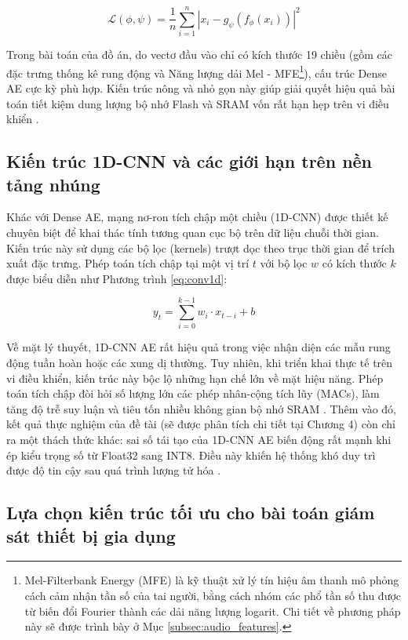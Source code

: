 \begin{equation}\label{eq:mse_loss}\mathcal{L}(\phi, \psi) = \frac{1}{n} \sum_{i=1}^{n} |x_i - g_{\psi}(f_{\phi}(x_i))|^2\end{equation}

Trong bài toán của đồ án, do vectơ đầu vào chỉ có kích thước 19 chiều (gồm các đặc trưng thống kê rung động và Năng lượng dải Mel - MFE\footnote{Mel-Filterbank Energy (MFE) là kỹ thuật xử lý tín hiệu âm thanh mô phỏng cách cảm nhận tần số của tai người, bằng cách nhóm các phổ tần số thu được từ biến đổi Fourier thành các dải năng lượng logarit. Chi tiết về phương pháp này sẽ được trình bày ở Mục \ref{subsec:audio_features}.}), cấu trúc Dense AE cực kỳ phù hợp. Kiến trúc nông và nhỏ gọn này giúp giải quyết hiệu quả bài toán tiết kiệm dung lượng bộ nhớ Flash và SRAM vốn rất hạn hẹp trên vi điều khiển \cite{ref_1_4}.

\subsection{Kiến trúc 1D-CNN và các giới hạn trên nền tảng nhúng}

Khác với Dense AE, mạng nơ-ron tích chập một chiều (1D-CNN) được thiết kế chuyên biệt để khai thác tính tương quan cục bộ trên dữ liệu chuỗi thời gian. Kiến trúc này sử dụng các bộ lọc (kernels) trượt dọc theo trục thời gian để trích xuất đặc trưng. Phép toán tích chập tại một vị trí $t$ với bộ lọc $w$ có kích thước $k$ được biểu diễn như Phương trình \ref{eq:conv1d}:

\begin{equation}\label{eq:conv1d}y_t = \sum_{i=0}^{k-1} w_i \cdot x_{t-i} + b\end{equation}

Về mặt lý thuyết, 1D-CNN AE rất hiệu quả trong việc nhận diện các mẫu rung động tuần hoàn hoặc các xung dị thường. Tuy nhiên, khi triển khai thực tế trên vi điều khiển, kiến trúc này bộc lộ những hạn chế lớn về mặt hiệu năng. Phép toán tích chập đòi hỏi số lượng lớn các phép nhân-cộng tích lũy (MACs), làm tăng độ trễ suy luận và tiêu tốn nhiều không gian bộ nhớ SRAM \cite{ref_1_1, ref_1_11}. Thêm vào đó, kết quả thực nghiệm của đề tài (sẽ được phân tích chi tiết tại Chương 4) còn chỉ ra một thách thức khác: sai số tái tạo của 1D-CNN AE biến động rất mạnh khi ép kiểu trọng số từ Float32 sang INT8. Điều này khiến hệ thống khó duy trì được độ tin cậy sau quá trình lượng tử hóa \cite{ref_1_1}.

\subsection{Lựa chọn kiến trúc tối ưu cho bài toán giám sát thiết bị gia dụng}

